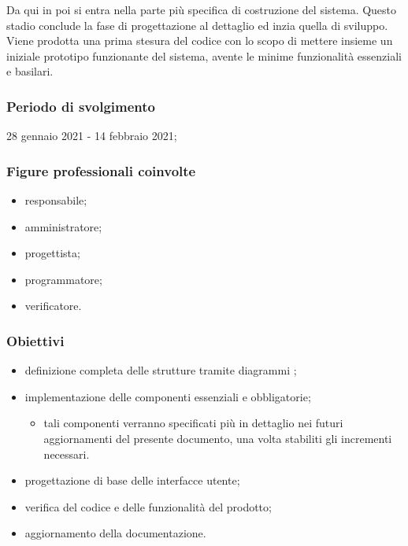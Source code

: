 Da qui in poi si entra nella parte più specifica di costruzione del sistema. Questo stadio conclude la fase di progettazione al dettaglio ed inzia quella di sviluppo. Viene prodotta una prima stesura del codice con lo scopo di mettere insieme un iniziale prototipo funzionante del sistema, avente le minime funzionalità essenziali e basilari. 
        
        \subsubsection{Periodo di svolgimento}
        28 gennaio 2021 - 14 febbraio 2021;
        
        \subsubsection{Figure professionali coinvolte}
            \begin{itemize}
                \item responsabile;
                \item amministratore;
                \item progettista;
                \item programmatore;
                \item verificatore.
            \end{itemize}

        \subsubsection{Obiettivi}    
        \begin{itemize}
            \item definizione completa delle strutture tramite diagrammi ;
            \item implementazione delle componenti essenziali e obbligatorie;
            \begin{itemize}
                \item tali componenti verranno specificati più in dettaglio nei futuri aggiornamenti del presente documento, una volta stabiliti gli incrementi necessari.
            \end{itemize}
            \item progettazione di base delle interfacce utente;
            \item verifica del codice e delle funzionalità del prodotto;
            \item aggiornamento della documentazione.
        \end{itemize}